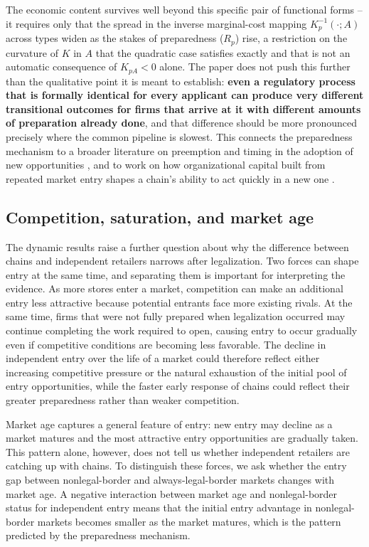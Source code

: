 \documentclass[english,12pt]{article}
\begin{document}
The economic content survives well beyond this specific pair of functional forms -- it requires only that the spread in the inverse marginal-cost mapping $K_p^{-1}(\cdot;A)$ across types widen as the stakes of preparedness ($R_p$) rise, a restriction on the curvature of $K$ in $A$ that the quadratic case satisfies exactly and that is not an automatic consequence of $K_{pA}<0$ alone. The paper does not push this further than the qualitative point it is meant to establish: \textbf{even a regulatory process that is formally identical for every applicant can produce very different transitional outcomes for firms that arrive at it with different amounts of preparation already done}, and that difference should be more pronounced precisely where the common pipeline is slowest. This connects the preparedness mechanism to a broader literature on preemption and timing in the adoption of new opportunities \citep{FudenbergTirole1985,Dixit1989}, and to work on how organizational capital built from repeated market entry shapes a chain's ability to act quickly in a new one \citep{PrescottVisscher1980,Jia2008}.

\color{black}
\subsection{Competition, saturation, and market age}
\label{sec:saturation}

The dynamic results raise a further question about why the difference between chains and independent retailers narrows after legalization. Two forces can shape entry at the same time, and separating them is important for interpreting the evidence. As more stores enter a market, competition can make an additional entry less attractive because potential entrants face more existing rivals. At the same time, firms that were not fully prepared when legalization occurred may continue completing the work required to open, causing entry to occur gradually even if competitive conditions are becoming less favorable. The decline in independent entry over the life of a market could therefore reflect either increasing competitive pressure or the natural exhaustion of the initial pool of entry opportunities, while the faster early response of chains could reflect their greater preparedness rather than weaker competition.

Market age captures a general feature of entry: new entry may decline as a market matures and the most attractive entry opportunities are gradually taken. This pattern alone, however, does not tell us whether independent retailers are catching up with chains. To distinguish these forces, we ask whether the entry gap between nonlegal-border and always-legal-border markets changes with market age. A negative interaction between market age and nonlegal-border status for independent entry means that the initial entry advantage in nonlegal-border markets becomes smaller as the market matures, which is the pattern predicted by the preparedness mechanism.
\end{document}

